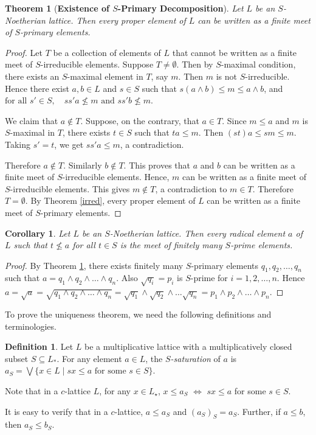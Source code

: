 \documentclass[10pt,twoside,a4]{amsart}
\numberwithin{equation}{section}
\theoremstyle{plain}
\newtheorem{thm}[lem]{Theorem}
\newtheorem{cor}[lem]{Corollary}
\theoremstyle{definition}
\newtheorem{definition}[lem]{Definition}
\begin{document}
\begin{thm}[\textbf{Existence of $S$-Primary Decomposition}]\label{Existence} 
	Let $L$ be an $S$-Noetherian lattice. Then every proper element of $L$ can be written as a finite meet of $S$-primary elements.
\end{thm}
\begin{proof}
	Let $T$ be a collection of elements of $L$ that cannot be written as a finite meet of $S$-irreducible elements. Suppose $T\neq \emptyset$. Then by $S$-maximal condition, there exists an $S$-maximal element in $T$, say $m$. Then $m$ is not $S$-irreducible. Hence there exist $a,b \in L$ and $s \in S$ such that $	s(a \wedge b)\leq m \leq a \wedge b$,  and $\text{for all } s' \in S,\quad ss'a \nleq m \text{ and } ss'b \nleq m.$
	
	We claim that $a \notin T$. Suppose, on the contrary, that $a \in T$.  Since $m \leq a$ and $m$ is $S$-maximal in $T$, there exists $t \in S$ such that $ta \leq m$. Then  $(st)a \leq sm \leq m$.  Taking $s' = t$, we get $ss'a \leq m$,  a contradiction.
	
	Therefore $a\notin T$. Similarly $b\notin T$. This proves that $a$ and $b$ can be written as a finite meet of $S$-irreducible elements. Hence, $m$ can be written as a finite meet of $S$-irreducible elements. This gives $m\notin T$, a contradiction to $m\in T$. Therefore $T=\emptyset$. By Theorem \ref{irred}, every proper element of $L$ can be written as a finite meet of $S$-primary elements. 
\end{proof}


\begin{cor}\label{} 
	Let $L$ be an $S$-Noetherian lattice. Then every radical element $a$ of $L$ such that $t\nleq a$ for all $t\in S$ is the meet of finitely many $S$-prime elements.
\end{cor}
\begin{proof}
	By Theorem \ref{Existence}, there exists finitely many $S$-primary elements $q_1,q_2,\dots,q_n$ such that $a=q_1\wedge q_2\wedge \dots \wedge q_n$. Also $\sqrt{q_i}=p_i$ is $S$-prime for $i=1,2,\dots, n$. Hence $a=\sqrt{a}=\sqrt{q_1\wedge q_2\wedge \dots \wedge q_n}=\sqrt{q_1}\wedge \sqrt{q_2}\wedge \dots \sqrt{q_n}=p_1\wedge p_2\wedge \dots \wedge p_n$. 
\end{proof}




To prove the uniqueness theorem, we need the following definitions and terminologies. 


\begin{definition}
	Let $L$ be a multiplicative lattice with a multiplicatively closed subset $S \subseteq L_*$.  For any element $a \in L$, the \textit{$S$-saturation} of $a$ is $a_S = \bigvee \{ x \in L \mid sx \leq a \text{ for some } s \in S \}$.
	
	Note that in a $c$-lattice $L$, for any $x\in L_{\star}$, $x\leq a_S$ $\iff$ $sx\leq a$ for some $s\in S$.
	
	It is easy to verify that in a $c$-lattice, $a \leq a_S$ and $(a_S)_S = a_S$. Further, if $a \leq b$, then $a_S \leq b_S$.
\end{definition}
\end{document}
